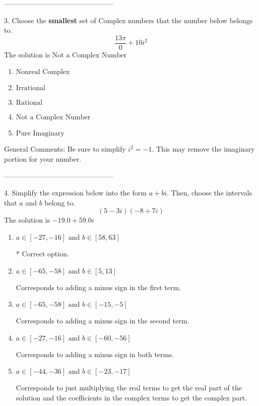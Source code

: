 \documentclass{article}[10pt]
\begin{document}
-----------------------------------------------

3. Choose the \textbf{smallest} set of Complex numbers that the number below belongs to.
$$ \frac{13 \pi}{0}+10 i^2 $$ 
The solution is $ \text{Not a Complex Number} $ 

\begin{enumerate}[label=\Alph*.] 
\item $ \text{Nonreal Complex} $ 

  
\item $ \text{Irrational} $ 

  
\item $ \text{Rational} $ 

  
\item $ \text{Not a Complex Number} $ 

  
\item $ \text{Pure Imaginary} $ 

  
\end{enumerate} 
 
General Comments: Be sure to simplify $i^2 = -1$. This may remove the imaginary portion for your number.

-----------------------------------------------

4. Simplify the expression below into the form $a+bi$. Then, choose the intervals that $a$ and $b$ belong to.
$$ (5 - 3 i)(-8 + 7 i) $$ 
The solution is $ -19.0 + 59.0 i $ 

\begin{enumerate}[label=\Alph*.] 
\item $ a \in [-27, -16] \text{ and } b \in [58, 63] $ 

 * Correct option. 
\item $ a \in [-65, -58] \text{ and } b \in [5, 13] $ 

  Corresponds to adding a minus sign in the first term. 
\item $ a \in [-65, -58] \text{ and } b \in [-15, -5] $ 

  Corresponds to adding a minus sign in the second term. 
\item $ a \in [-27, -16] \text{ and } b \in [-60, -56] $ 

  Corresponds to adding a minus sign in both terms. 
\item $ a \in [-44, -36] \text{ and } b \in [-23, -17] $ 

  Corresponds to just multiplying the real terms to get the real part of the solution and the coefficients in the complex terms to get the complex part. 
\end{enumerate} 
 
\end{document}
